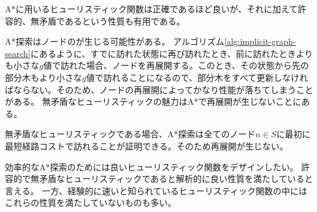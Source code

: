 A*に用いるヒューリスティック関数は正確であるほど良いが、それに加えて許容的、無矛盾であるという性質も有用である。



A*探索はノードのが生じる可能性がある。
アルゴリズム\ref{alg:implicit-graph-search}にあるように、すでに訪れた状態に再び訪れたとき、前に訪れたときよりも小さな$g$値で訪れた場合、ノードを再展開する。このとき、その状態から先の部分木もより小さな$g$値で訪れることになるので、部分木をすべて更新しなければならない。そのため、ノードの再展開によってかなり性能が落ちてしまうことがある。
無矛盾なヒューリスティックの魅力はA*で再展開が生じないことにある。


無矛盾なヒューリスティックである場合、A*探索は全てのノード$n \in S$に最初に最短経路コストで訪れることが証明できる。そのため再展開が生じない。

効率的なA*探索のためには良いヒューリスティック関数をデザインしたい。
許容的で無矛盾なヒューリスティックであると解析的に良い性質を満たしていると言える。
一方、経験的に速いと知られているヒューリスティック関数の中にはこれらの性質を満たしていないものも多い。

% 


